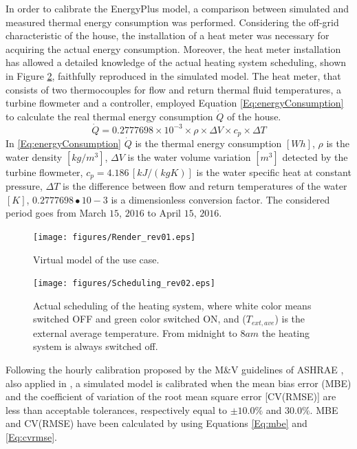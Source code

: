 In order to calibrate the EnergyPlus model, a comparison between simulated and measured thermal energy consumption was performed. Considering the off-grid characteristic of the house, the installation of a heat meter was necessary for acquiring the actual energy consumption. Moreover, the heat meter installation has allowed a detailed knowledge of the actual heating system scheduling, shown in Figure \ref{F:houseActualScheduling}, faithfully reproduced in the simulated model. The heat meter, that consists of two thermocouples for flow and return thermal fluid temperatures, a turbine flowmeter and a controller, employed Equation \eqref{Eq:energyConsumption} to calculate the real thermal energy consumption $\dot Q$ of the house.
\begin{equation}\label{Eq:energyConsumption}
\dot Q = 0.2777698\times10^{-3}\times\rho\times\Delta V\times c_p\times\Delta T
\end{equation}
In \eqref{Eq:energyConsumption} $\dot Q$ is the thermal energy consumption $[Wh]$, $\rho$ is the water density $[kg/m^3]$, $\Delta V$ is the water volume variation $[m^3]$ detected by the turbine flowmeter, $c_p = 4.186\, [kJ/(kgK)]$ is the water specific heat at constant pressure, $\Delta T$ is the difference between flow and return temperatures of the water $[K]$, $0.2777698∙10−3$ is a dimensionless conversion factor. The considered period goes from March $15$, $2016$ to April $15$, $2016$.
\begin{figure}[t!]
	\begin{center}
		\texttt{[image: figures/Render\_rev01.eps]}
		\caption{Virtual model of the use case.}
		\captionsetup{justification=centering}
		\label{F:houseVirtualModel}
	\end{center}
\end{figure}
\begin{figure}[t!]
	\begin{center}
		\texttt{[image: figures/Scheduling\_rev02.eps]}
		\caption{Actual scheduling of the heating system, where white color means switched OFF and green color switched ON, and ($T_{ext,ave}$) is the external average temperature. From midnight to $8am$ the heating system is always switched off.}
		\captionsetup{justification=centering}
		\label{F:houseActualScheduling}
	\end{center}
\end{figure}
Following the hourly calibration proposed by the M\&V guidelines of ASHRAE \cite{USDOE}, also applied in \cite{Mustafarai2014,Raftery2011}, a simulated model is calibrated when the mean bias error (MBE) and the coefficient of variation of the root mean square error [CV(RMSE)] are less than acceptable tolerances, respectively equal to $\pm 10.0\%$ and $30.0\%$. MBE and CV(RMSE) have been calculated by using Equations \eqref{Eq:mbe} and \eqref{Eq:cvrmse}.


